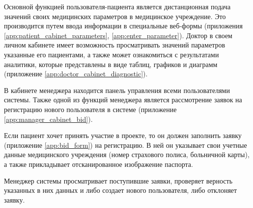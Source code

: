 Основной функцией пользователя-пациента является дистанционная подача  значений
своих медицинских параметров в медицинское учреждение. Это производится путем
ввода информации в специальные веб-формы (приложения
\ref{app:patient_cabinet_parameters}, \ref{app:enter_parameter}). Доктор в своем личном
кабинете имеет возможность просматривать значений параметров указанные его пациентами, а также
может ознакомиться с результатами аналитики, которые представлены в виде таблиц,
графиков и диаграмм (приложение \ref{app:doctor_cabinet_diagnostic}).

В кабинете менеджера находится панель управления всеми пользователями системы.
Также одной из функций менеджера является рассмотрение заявок на регистрацию
нового пользователя в системе (приложение \ref{app:manager_cabinet_bid}).

Если пациент хочет принять участие в проекте, то он должен заполнить заявку
(приложение \ref{app:bid_form}) на регистрацию. В ней он указывает свои учетные
данные медицинского учреждения (номер страхового полиса, больничной карты), а
также прикладывает отсканированное изображение паспорта.

Менеджер системы просматривает поступившие заявки, проверяет верность указанных
в них данных и либо создает нового пользователя, либо отклоняет заявку.